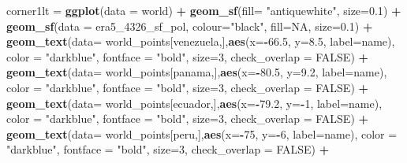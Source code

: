 \documentclass[12pt,oneside]{reedthesis}
\newenvironment{Shaded}{\begin{snugshade}}{\end{snugshade}}
\newcommand{\DataTypeTok}[1]{\textcolor[rgb]{0.13,0.29,0.53}{#1}}
\newcommand{\DecValTok}[1]{\textcolor[rgb]{0.00,0.00,0.81}{#1}}
\newcommand{\FloatTok}[1]{\textcolor[rgb]{0.00,0.00,0.81}{#1}}
\newcommand{\KeywordTok}[1]{\textcolor[rgb]{0.13,0.29,0.53}{\textbf{#1}}}
\newcommand{\NormalTok}[1]{#1}
\newcommand{\OperatorTok}[1]{\textcolor[rgb]{0.81,0.36,0.00}{\textbf{#1}}}
\newcommand{\OtherTok}[1]{\textcolor[rgb]{0.56,0.35,0.01}{#1}}
\newcommand{\StringTok}[1]{\textcolor[rgb]{0.31,0.60,0.02}{#1}}
\begin{document}
\begin{Shaded}
\begin{Highlighting}[]
\NormalTok{corner1lt =}\StringTok{ }\KeywordTok{ggplot}\NormalTok{(}\DataTypeTok{data =}\NormalTok{ world) }\OperatorTok{+}\StringTok{ }
\StringTok{  }\KeywordTok{geom_sf}\NormalTok{(}\DataTypeTok{fill=} \StringTok{"antiquewhite"}\NormalTok{,  }\DataTypeTok{size=}\FloatTok{0.1}\NormalTok{) }\OperatorTok{+}\StringTok{ }
\StringTok{  }\KeywordTok{geom_sf}\NormalTok{(}\DataTypeTok{data =}\NormalTok{ era5_}\DecValTok{4326}\NormalTok{_sf_pol, }\DataTypeTok{colour=}\StringTok{"black"}\NormalTok{, }\DataTypeTok{fill=}\OtherTok{NA}\NormalTok{, }\DataTypeTok{size=}\FloatTok{0.1}\NormalTok{) }\OperatorTok{+}
\StringTok{  }\KeywordTok{geom_text}\NormalTok{(}\DataTypeTok{data=}\NormalTok{ world_points[venezuela,],}\KeywordTok{aes}\NormalTok{(}\DataTypeTok{x=}\OperatorTok{-}\FloatTok{66.5}\NormalTok{, }\DataTypeTok{y=}\FloatTok{8.5}\NormalTok{, }\DataTypeTok{label=}\NormalTok{name), }\DataTypeTok{color =} \StringTok{"darkblue"}\NormalTok{, }\DataTypeTok{fontface =} \StringTok{"bold"}\NormalTok{, }\DataTypeTok{size=}\DecValTok{3}\NormalTok{, }\DataTypeTok{check_overlap =} \OtherTok{FALSE}\NormalTok{) }\OperatorTok{+}
\StringTok{  }\KeywordTok{geom_text}\NormalTok{(}\DataTypeTok{data=}\NormalTok{ world_points[panama,],}\KeywordTok{aes}\NormalTok{(}\DataTypeTok{x=}\OperatorTok{-}\FloatTok{80.5}\NormalTok{, }\DataTypeTok{y=}\FloatTok{9.2}\NormalTok{, }\DataTypeTok{label=}\NormalTok{name), }\DataTypeTok{color =} \StringTok{"darkblue"}\NormalTok{, }\DataTypeTok{fontface =} \StringTok{"bold"}\NormalTok{, }\DataTypeTok{size=}\DecValTok{3}\NormalTok{, }\DataTypeTok{check_overlap =} \OtherTok{FALSE}\NormalTok{) }\OperatorTok{+}\StringTok{ }
\StringTok{  }\KeywordTok{geom_text}\NormalTok{(}\DataTypeTok{data=}\NormalTok{ world_points[ecuador,],}\KeywordTok{aes}\NormalTok{(}\DataTypeTok{x=}\OperatorTok{-}\FloatTok{79.2}\NormalTok{, }\DataTypeTok{y=}\OperatorTok{-}\DecValTok{1}\NormalTok{, }\DataTypeTok{label=}\NormalTok{name), }\DataTypeTok{color =} \StringTok{"darkblue"}\NormalTok{, }\DataTypeTok{fontface =} \StringTok{"bold"}\NormalTok{, }\DataTypeTok{size=}\DecValTok{3}\NormalTok{, }\DataTypeTok{check_overlap =} \OtherTok{FALSE}\NormalTok{) }\OperatorTok{+}
\StringTok{  }\KeywordTok{geom_text}\NormalTok{(}\DataTypeTok{data=}\NormalTok{ world_points[peru,],}\KeywordTok{aes}\NormalTok{(}\DataTypeTok{x=}\OperatorTok{-}\DecValTok{75}\NormalTok{, }\DataTypeTok{y=}\OperatorTok{-}\DecValTok{6}\NormalTok{, }\DataTypeTok{label=}\NormalTok{name), }\DataTypeTok{color =} \StringTok{"darkblue"}\NormalTok{, }\DataTypeTok{fontface =} \StringTok{"bold"}\NormalTok{, }\DataTypeTok{size=}\DecValTok{3}\NormalTok{, }\DataTypeTok{check_overlap =} \OtherTok{FALSE}\NormalTok{) }\OperatorTok{+}

\end{Highlighting}
\end{Shaded}
\end{document}
